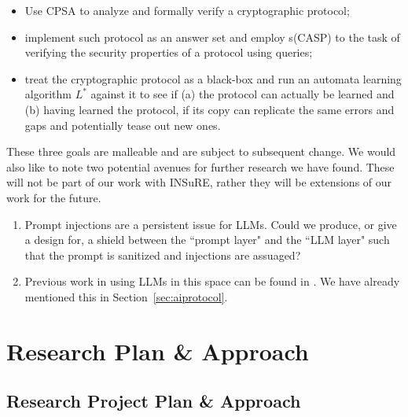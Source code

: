 \documentclass[11pt]{article}
\begin{document}
\begin{itemize}
    \item Use CPSA to analyze and formally verify a cryptographic protocol;
    \item implement such protocol as an answer set and employ s(CASP) to the task of verifying the security properties of a protocol using queries; 
    \item treat the cryptographic protocol as a black-box and run an automata learning algorithm $L^*$ against it to see if (a) the protocol can actually be learned and (b) having learned the protocol, if its copy can replicate the same errors and gaps and potentially tease out new ones.  
\end{itemize}

These three goals are malleable and are subject to subsequent change. We would also like to note two potential avenues for further research we have found. These will not be part of our work with INSuRE, rather they will be extensions of our work for the future. 
\begin{enumerate}
    \item Prompt injections are a persistent issue for LLMs. Could we produce, or give a design for, a shield between the ``prompt layer" and the ``LLM layer" such that the prompt is sanitized and injections are assuaged?
    \item Previous work in using LLMs in this space can be found in \cite{curaba2024cryptoformalevalintegratingllmsformal}. We have already mentioned this in Section~\ref{sec:aiprotocol}.
\end{enumerate}
 
\section{Research Plan \& Approach}

\subsection{Research Project Plan \& Approach}
\end{document}
